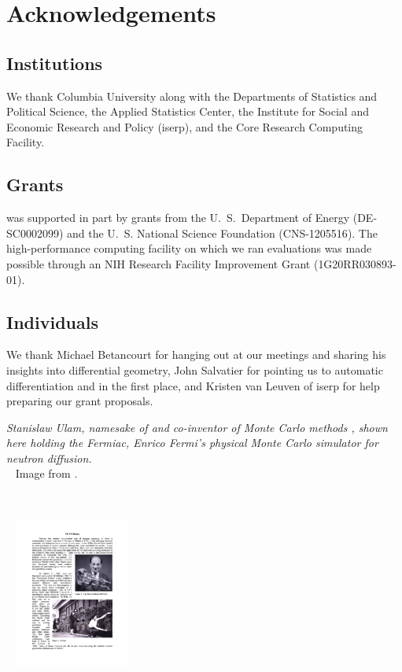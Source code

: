 \chapter*{Acknowledgements}

\section*{Institutions}

We thank Columbia University along with the Departments of
Statistics and Political Science, the Applied Statistics Center, the
Institute for Social and Economic Research and Policy ({\sc iserp}),
and the Core Research Computing Facility.

\section*{Grants}

\Stan was supported in part by grants from the U.~S.\ Department of
Energy ({\small DE-SC0002099}) and the U.~S. National Science
Foundation ({\small CNS-1205516}).  The high-performance computing
facility on which we ran evaluations was made possible through an NIH
Research Facility Improvement Grant ({\small 1G20RR030893-01}).


\section*{Individuals}

We thank Michael Betancourt for hanging out at our meetings and
sharing his insights into differential geometry, John Salvatier for
pointing us to automatic differentiation and \HMC in the first place,
and Kristen van Leuven of {\sc iserp} for help preparing our grant
proposals.

\vfill
\begin{center}
\hfill
\begin{minipage}[b]{2in}
  \footnotesize {\it Stanislaw Ulam, namesake of \Stan and co-inventor
    of Monte Carlo methods \citep{MetropolisUlam:1949}, shown here
    holding the Fermiac, Enrico Fermi's physical Monte Carlo simulator
    for neutron diffusion.}
  \\[3pt] \mbox{ } \hfill
  {\scriptsize Image from \citep{Giesler:2000}.}
\end{minipage} \ \ \ \ \ 
\begin{minipage}[b]{1.5in} \mbox{ } \hfill
  \includegraphics[width=1.5in]{../../../logos/ulam-fermiac.pdf}
\end{minipage} 
\end{center}
